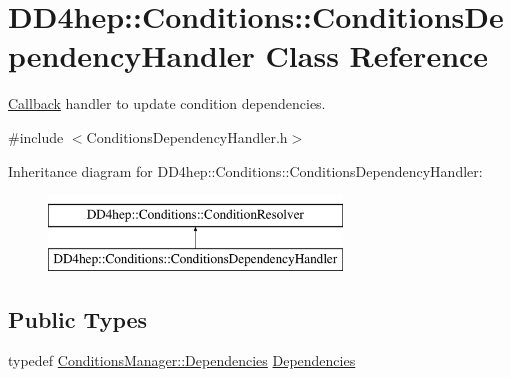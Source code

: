 \hypertarget{class_d_d4hep_1_1_conditions_1_1_conditions_dependency_handler}{}\section{D\+D4hep\+:\+:Conditions\+:\+:Conditions\+Dependency\+Handler Class Reference}
\label{class_d_d4hep_1_1_conditions_1_1_conditions_dependency_handler}


\hyperlink{class_d_d4hep_1_1_callback}{Callback} handler to update condition dependencies.  




{\ttfamily \#include $<$Conditions\+Dependency\+Handler.\+h$>$}

Inheritance diagram for D\+D4hep\+:\+:Conditions\+:\+:Conditions\+Dependency\+Handler\+:\begin{figure}[H]
\begin{center}
\leavevmode
\includegraphics[height=2.000000cm]{class_d_d4hep_1_1_conditions_1_1_conditions_dependency_handler}
\end{center}
\end{figure}
\subsection*{Public Types}
\begin{DoxyCompactItemize}
\item 
typedef \hyperlink{class_d_d4hep_1_1_conditions_1_1_conditions_manager_aab778cfbe096ae8ad20a0bdbb047ad32}{Conditions\+Manager\+::\+Dependencies} \hyperlink{class_d_d4hep_1_1_conditions_1_1_conditions_dependency_handler_a4a063b30ffccb0e30f3302f1537aef10}{Dependencies}
\end{DoxyCompactItemize}
